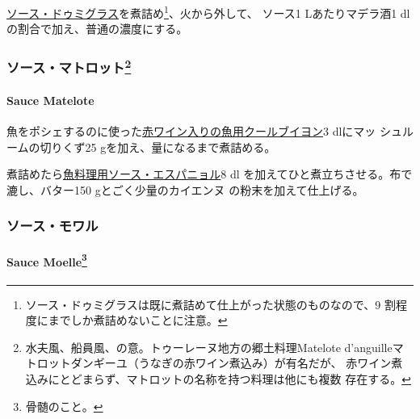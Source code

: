 \begin{recette}
\protect\hyperlink{sauce-demi-glace}{ソース・ドゥミグラス}を煮詰め\footnote{ソース・ドゥミグラスは既に煮詰めて仕上がった状態のものなので、9
  割程度にまでしか煮詰めないことに注意。}、火から外して、 ソース1
Lあたりマデラ酒1 dlの割合で加え、普通の濃度にする。

\maeaki

\hypertarget{ux30bdux30fcux30b9ux30deux30c8ux30edux30c3ux30c854}{%
\subsubsection[ソース・マトロット]{\texorpdfstring{ソース・マトロット\footnote{水夫風、船員風、の意。トゥーレーヌ地方の郷土料理Matelote
  d'anguilleマトロットダンギーユ（うなぎの赤ワイン煮込み）が有名だが、
  赤ワイン煮込みにとどまらず、マトロットの名称を持つ料理は他にも複数
  存在する。}}{ソース・マトロット}}\label{ux30bdux30fcux30b9ux30deux30c8ux30edux30c3ux30c854}}

\hypertarget{sauce-matelote}{%
\paragraph{Sauce Matelote}\label{sauce-matelote}}


魚をポシェするのに使った\protect\hyperlink{}{赤ワイン入りの魚用クールブイヨン}3
dlにマッ シュルームの切りくず25
gを加え、\untiers{}量になるまで煮詰める。

煮詰めたら\protect\hyperlink{sauce-espagnole-maigre}{魚料理用ソース・エスパニョル}8
dl を加えてひと煮立ちさせる。布で漉し、バター150 gとごく少量のカイエンヌ
の粉末を加えて仕上げる。

\maeaki

\hypertarget{ux30bdux30fcux30b9ux30e2ux30efux30eb}{%
\subsubsection{ソース・モワル}\label{ux30bdux30fcux30b9ux30e2ux30efux30eb}}

\hypertarget{sauce-moelle}{%
\paragraph[Sauce Moelle]{\texorpdfstring{Sauce Moelle\footnote{骨髄のこと。}}{Sauce Moelle}}\label{sauce-moelle}}


\end{recette}
